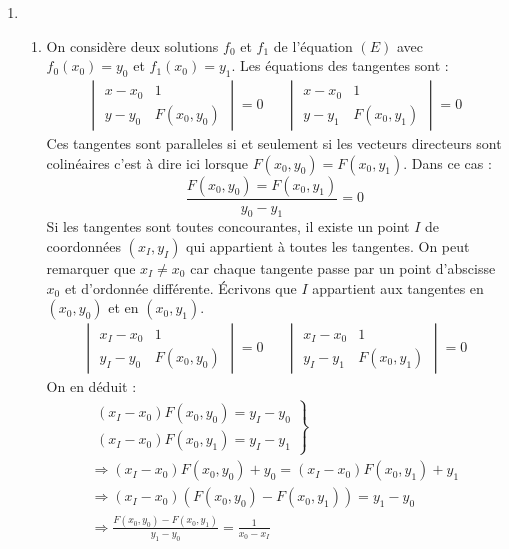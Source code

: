 \begin{enumerate}
\begin{itemize}
\end{itemize}
\item 
\begin{enumerate}
 \item On considère deux solutions $f_0$ et $f_1$ de l'équation $(E)$ avec $f_0(x_0)=y_0$ et  $f_1(x_0)=y_1$. Les équations des tangentes sont :
\begin{align*}
 \begin{vmatrix}
  x-x_0 & 1 \\
  y-y_0 & F(x_0,y_0)
 \end{vmatrix} = 0
& &
 \begin{vmatrix}
  x-x_0 & 1 \\
  y-y_1 & F(x_0,y_1)
 \end{vmatrix} = 0
\end{align*}
 Ces tangentes sont paralleles si et seulement si les vecteurs directeurs sont colinéaires c'est à dire ici lorsque $F(x_0,y_0)=F(x_0,y_1)$. Dans ce cas :
\begin{displaymath}
 \frac{F(x_0,y_0)=F(x_0,y_1)}{y_0 - y_1} = 0
\end{displaymath}
Si les tangentes sont toutes concourantes, il existe un point $I$ de coordonnées $(x_I,y_I)$ qui appartient à toutes les tangentes. On peut remarquer que $x_I\neq x_0$ car chaque tangente passe par un point d'abscisse $x_0$ et d'ordonnée différente. \'Ecrivons que $I$ appartient aux tangentes en $(x_0,y_0)$ et en $(x_0,y_1)$.
\begin{align*}
 \begin{vmatrix}
  x_I-x_0 & 1 \\
  y_I-y_0 & F(x_0,y_0)
 \end{vmatrix} = 0
& &
 \begin{vmatrix}
  x_I-x_0 & 1 \\
  y_I-y_1 & F(x_0,y_1)
 \end{vmatrix} = 0
\end{align*}
On en déduit :
\begin{multline*}
 \left. 
\begin{aligned}
 (x_I-x_0)F(x_0,y_0) = y_I-y_0\\
 (x_I-x_0)F(x_0,y_1) = y_I-y_1
\end{aligned}
\right\rbrace \\
\Rightarrow
 (x_I-x_0)F(x_0,y_0) + y_0 = (x_I-x_0)F(x_0,y_1) + y_1 \\
\Rightarrow
(x_I-x_0)(F(x_0,y_0)-F(x_0,y_1)) = y_1 - y_0 \\
\Rightarrow
\frac{F(x_0,y_0)-F(x_0,y_1)}{y_1-y_0} = \frac{1}{x_0 - x_I}
\end{multline*}


\end{enumerate}
\end{enumerate}
